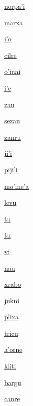 {\hyperlink{val:norpahi}{norpa'i}}{}{}{}

{\hyperlink{val:marxa}{marxa}}{}{}{}

{\hyperlink{val:iho}{i'o}}{}{}{}

{\hyperlink{val:cilre}{cilre}}{}{}{}

{\hyperlink{val:ohinai}{o'inai}}{}{}{}

{\hyperlink{val:ihe}{i'e}}{}{}{}

{\hyperlink{val:zau}{zau}}{}{}{}

{\hyperlink{val:sezau}{sezau}}{}{}{}

{\hyperlink{val:zanru}{zanru}}{}{}{}

{\hyperlink{val:jihi}{ji'i}}{}{}{}

{\hyperlink{val:pijihi}{piji'i}}{}{}{}

{\hyperlink{val:mohineha}{mo'ine'a}}{}{}{}

{\hyperlink{val:levu}{levu}}{}{}{}

{\hyperlink{val:tu}{tu}}{}{}{}

{\hyperlink{val:tu}{tu}}{}{}{}

{\hyperlink{val:vi}{vi}}{}{}{}

{\hyperlink{val:nau}{nau}}{}{}{}

{\hyperlink{val:xrabo}{xrabo}}{}{}{}

{\hyperlink{val:jukni}{jukni}}{}{}{}

{\hyperlink{val:plixa}{plixa}}{}{}{}

{\hyperlink{val:tricu}{tricu}}{}{}{}

{\hyperlink{val:ahorne}{a'orne}}{}{}{}

{\hyperlink{val:kliti}{kliti}}{}{}{}

{\hyperlink{val:bargu}{bargu}}{}{}{}

{\hyperlink{val:canre}{canre}}{}{}{}

